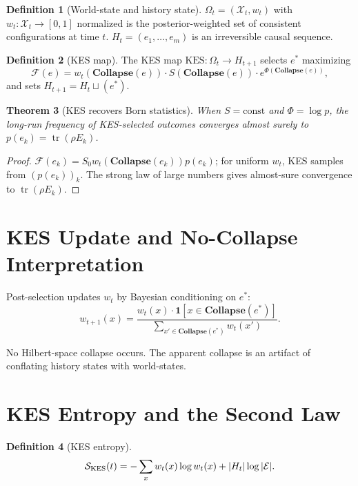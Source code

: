 \documentclass[11pt, openright, twoside]{book}
\theoremstyle{plain}
\newtheorem{theorem}{Theorem}[chapter]
\theoremstyle{definition}
\newtheorem{definition}[theorem]{Definition}
\theoremstyle{remark}
\newcommand{\Sfield}{S}
\newcommand{\Collapse}{\mathbf{Collapse}}
\begin{document}
\begin{definition}[World-state and history state]
$\Omega_t=(\mathcal{X}_t,w_t)$ with $w_t:\mathcal{X}_t\to[0,1]$ normalized is the
posterior-weighted set of consistent configurations at time $t$.
$H_t=(e_1,\ldots,e_m)$ is an irreversible causal sequence.
\end{definition}

\begin{definition}[KES map]
\label{def:kes}
The KES map $\mathrm{KES}:\Omega_t\to H_{t+1}$ selects $e^*$ maximizing
\begin{equation}
  \mathcal{F}(e) = w_t(\Collapse(e))\cdot\Sfield(\Collapse(e))\cdot e^{\Phi(\Collapse(e))},
  \label{eq:kes_functional}
\end{equation}
and sets $H_{t+1}=H_t\sqcup(e^*)$.
\end{definition}

\begin{theorem}[KES recovers Born statistics]
\label{thm:kes_born}
When $\Sfield=\mathrm{const}$ and $\Phi=\log p$, the long-run frequency of KES-selected
outcomes converges almost surely to $p(e_k)=\operatorname{tr}(\rho E_k)$.
\end{theorem}

\begin{proof}
$\mathcal{F}(e_k)=S_0 w_t(\Collapse(e_k))p(e_k)$; for uniform $w_t$, KES samples from
$(p(e_k))_k$. The strong law of large numbers gives almost-sure convergence to
$\operatorname{tr}(\rho E_k)$.
\end{proof}

\section{KES Update and No-Collapse Interpretation}

Post-selection updates $w_t$ by Bayesian conditioning on $e^*$:
\begin{equation}
  w_{t+1}(x) = \frac{w_t(x)\cdot\mathbf{1}[x\in\Collapse(e^*)]}
  {\sum_{x'\in\Collapse(e^*)}w_t(x')}.
\end{equation}

No Hilbert-space collapse occurs. The apparent collapse is an artifact of conflating history
states with world-states.

\section{KES Entropy and the Second Law}

\begin{definition}[KES entropy]
\begin{equation}
  \mathcal{S}_{\rm KES}(t) = -\sum_x w_t(x)\log w_t(x) + |H_t|\log|\mathcal{E}|.
\end{equation}
\end{definition}
\end{document}
